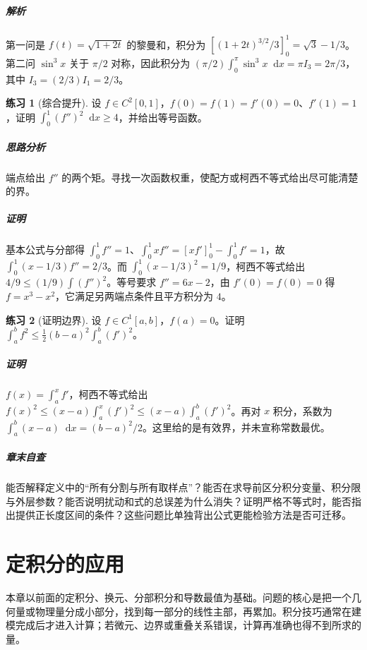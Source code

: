 \documentclass[UTF8,fontset=fandol,12pt,oneside,openany]{ctexrep}
\newcommand{\dd}{\mathop{}\!\mathrm d}
\theoremstyle{definition}
\newtheorem{exercise}{练习}[chapter]
\begin{document}
\paragraph{解析} 第一问是 $f(t)=\sqrt{1+2t}$ 的黎曼和，积分为 $[(1+2t)^{3/2}/3]_0^1=\sqrt3-1/3$。第二问 $\sin^3x$ 关于 $\pi/2$ 对称，因此积分为 $(\pi/2)\int_0^\pi\sin^3x\dd x=\pi I_3=2\pi/3$，其中 $I_3=(2/3)I_1=2/3$。
\begin{exercise}[综合提升]
设 $f\in C^2[0,1]$，$f(0)=f(1)=f'(0)=0$、$f'(1)=1$，证明 $\int_0^1(f'')^2\dd x\ge4$，并给出等号函数。
\end{exercise}
\paragraph{思路分析} 端点给出 $f''$ 的两个矩。寻找一次函数权重，使配方或柯西不等式给出尽可能清楚的界。
\paragraph{证明} 基本公式与分部得 $\int_0^1f''=1$、$\int_0^1xf''=[xf']_0^1-\int_0^1f'=1$，故 $\int_0^1(x-1/3)f''=2/3$。而 $\int_0^1(x-1/3)^2=1/9$，柯西不等式给出 $4/9\le(1/9)\int(f'')^2$。等号要求 $f''=6x-2$，由 $f'(0)=f(0)=0$ 得 $f=x^3-x^2$，它满足另两端点条件且平方积分为 $4$。
\begin{exercise}[证明边界]
设 $f\in C^1[a,b]$，$f(a)=0$。证明 $\int_a^bf^2\le\frac12(b-a)^2\int_a^b(f')^2$。
\end{exercise}
\paragraph{证明} $f(x)=\int_a^xf'$，柯西不等式给出 $f(x)^2\le(x-a)\int_a^x(f')^2\le(x-a)\int_a^b(f')^2$。再对 $x$ 积分，系数为 $\int_a^b(x-a)\dd x=(b-a)^2/2$。这里给的是有效界，并未宣称常数最优。
\paragraph{章末自查} 能否解释定义中的“所有分割与所有取样点”？能否在求导前区分积分变量、积分限与外层参数？能否说明扰动和式的总误差为什么消失？证明严格不等式时，能否指出提供正长度区间的条件？这些问题比单独背出公式更能检验方法是否可迁移。


\chapter{定积分的应用}
\label{lec:12:chapter}

本章以前面的定积分、换元、分部积分和导数最值为基础。问题的核心是把一个几何量或物理量分成小部分，找到每一部分的线性主部，再累加。积分技巧通常在建模完成后才进入计算；若微元、边界或重叠关系错误，计算再准确也得不到所求的量。
\end{document}
